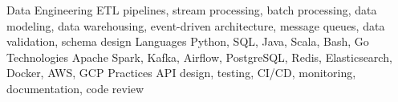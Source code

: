 %
%
%


\begin{skills}
  \skill
    {Data Engineering}
    {ETL pipelines, stream processing, batch processing, data modeling, data warehousing, event-driven architecture, message queues, data validation, schema design}
  \skill
    {Languages}
    {Python, SQL, Java, Scala, Bash, Go}
  \skill
    {Technologies}
    {Apache Spark, Kafka, Airflow, PostgreSQL, Redis, Elasticsearch, Docker, AWS, GCP}
  \skill
    {Practices}
    {API design, testing, CI/CD, monitoring, documentation, code review}
\end{skills}
